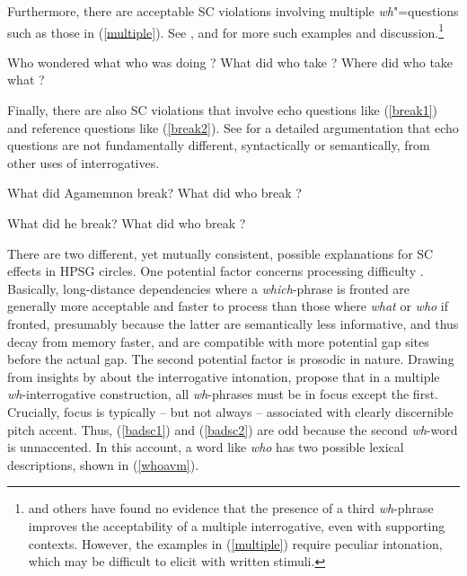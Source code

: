\documentclass[output=paper
 	        ,biblatex
                ,babelshorthands
                ,newtxmath
                ,draftmode
                ,colorlinks, citecolor=brown
]{langscibook}
\begin{document}
\eal  \label{which}
\zl



Furthermore, there are acceptable SC violations involving multiple \emph{wh}"=questions such as those in (\ref{multiple}). See \citet{Bolinger78}, \citet{kayne83} and \citet[109]{pesetskydlink} for more
such examples and discussion.\footnote{\citet{gibson10} and others have found no evidence
that the presence of a third \emph{wh}-phrase improves the acceptability of a multiple
interrogative, even with supporting contexts. However, the examples in (\ref{multiple}) 
require peculiar intonation, which may be difficult to elicit with written stimuli.} 

\eal \label{multiple}
\ex Who wondered what {\sc who} was doing \spc?
\ex What did {\sc who} take ?
\ex Where did {\sc who} take {\sc what} \spc?
\zl

\noindent 
Finally, there are also SC violations that involve echo questions like (\ref{break1}) and reference
questions like (\ref{break2}). See \citet[Chapter 7]{ginzsag} for a detailed argumentation that echo questions are not fundamentally different, syntactically or semantically,   from other uses of interrogatives.

\eal \label{break1}
\ex What did Agamemnon break?
\ex What did {\sc who} break \spc?
\zl

\eal  \label{break2}
\ex What did he break?
\ex What did {\sc who} break \spc?
\zl

There are two different, yet mutually consistent, possible explanations for SC effects in HPSG circles.
 One potential factor concerns  processing difficulty \citep{arnon07}. Basically,  long-distance dependencies where a \emph{which}-phrase is fronted are  generally  more acceptable and faster to process than those where \emph{what} or \emph{who} if fronted, presumably  because the latter are semantically less informative, and thus decay from memory faster,  and are compatible  with more potential gap sites before the actual gap.
 The second potential factor is prosodic in nature. Drawing from insights by 
\citet[170--172]{Ladd96} about the
 interrogative intonation, \citet[251]{ginzsag} propose that in a multiple \emph{wh}-interrogative construction, all \emph{wh}-phrases must be in focus except  the first. Crucially, focus is typically -- but not always --  associated with clearly discernible pitch accent. Thus, (\ref{badsc1})  and (\ref{badsc2}) are odd because  the second \emph{wh}-word is unnaccented. In this account, a word like \emph{who} has two possible lexical descriptions, shown in (\ref{whoavm}).
\end{document}
